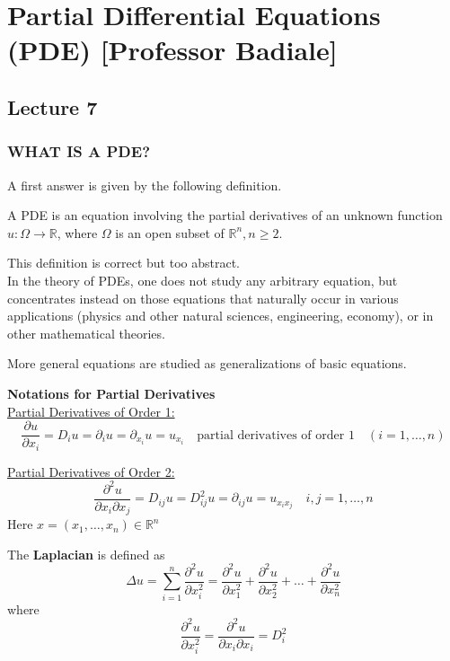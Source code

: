 \chapter{Partial Differential Equations (PDE) [Professor Badiale]}
\section{Lecture 7}
\subsection{WHAT IS A PDE?}

A first answer is given by the following definition. 
\begin{DefBox}
    \begin{Def}
        A PDE is an equation involving the partial derivatives of an unknown function \( u: \Omega \to \mathbb{R} \), where \( \Omega \) is an open subset of \( \mathbb{R}^n, n \geq 2 \).
    \end{Def}
\end{DefBox}

This definition is correct but too abstract.\\
In the theory of PDEs, one does not study any arbitrary equation, but concentrates instead on those equations that naturally occur in various applications (physics and other natural sciences, engineering, economy), or in other mathematical theories.

More general equations are studied as generalizations of basic equations.

\textbf{Notations for Partial Derivatives}\\
\underline{Partial Derivatives of Order 1:}
\[
\frac{\partial u}{\partial x_i} = D_{i}u = \partial_{i}u = \partial_{x_i} u = u_{x_i} \quad \text{partial derivatives of order $1$} \quad (i= 1, \ldots, n)
\]


\underline{Partial Derivatives of Order 2: } 
\[
\frac{\partial^2 u}{\partial x_i \partial x_j} = D_{ij}u = D^2_{ij}u = \partial_{ij}u = u_{x_ix_j} \quad i,j = 1, \ldots, n
\]
Here $x = (x_1, \ldots, x_n) \in \mathbb{R}^n$

\begin{DefBox}
    \begin{Def}
        The \textbf{Laplacian} is defined as 
        \[
\Delta u = \sum_{i = 1}^n \frac{\partial^2 u}{\partial x_i^2} =  \frac{\partial^2 u}{\partial x_1^2} + \frac{\partial^2 u}{\partial x_2^2} + \dots + \frac{\partial^2 u}{\partial x_n^2}
\]
where 
\begin{equation*}
    \frac{\partial^2 u}{\partial x_i^2} = \frac{\partial^2 u}{\partial x_i \partial x_i} = D_i^2
\end{equation*}
    \end{Def}
\end{DefBox}


